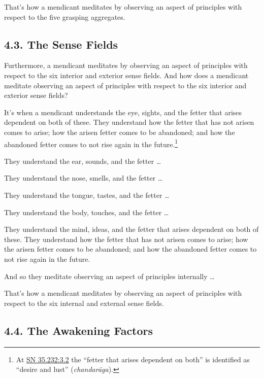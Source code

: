\documentclass[12pt,openany]{book}%
\begin{document}
That’s how a mendicant meditates by observing an aspect of principles with respect to the five grasping aggregates. 

\subsection*{4.3. The Sense Fields }

Furthermore, a mendicant meditates by observing an aspect of principles with respect to the six interior and exterior sense fields. And how does a mendicant meditate observing an aspect of principles with respect to the six interior and exterior sense fields? 

It’s when a mendicant understands the eye, sights, and the fetter that arises dependent on both of these. They understand how the fetter that has not arisen comes to arise; how the arisen fetter comes to be abandoned; and how the abandoned fetter comes to not rise again in the future.\footnote{At \href{https://suttacentral.net/sn35.232/en/sujato\#3.2}{SN 35.232:3.2} the “fetter that arises dependent on both” is identified as “desire and lust” (\textit{\textsanskrit{chandarāga}}). } 

They understand the ear, sounds, and the fetter … 

They understand the nose, smells, and the fetter … 

They understand the tongue, tastes, and the fetter … 

They understand the body, touches, and the fetter … 

They understand the mind, ideas, and the fetter that arises dependent on both of these. They understand how the fetter that has not arisen comes to arise; how the arisen fetter comes to be abandoned; and how the abandoned fetter comes to not rise again in the future. 

And so they meditate observing an aspect of principles internally … 

That’s how a mendicant meditates by observing an aspect of principles with respect to the six internal and external sense fields. 

\subsection*{4.4. The Awakening Factors }
\end{document}
